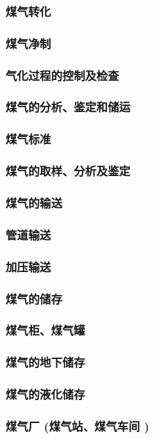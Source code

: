 \documentclass[UTF8]{../../ApplicationUniverse}
\begin{document}
    \subsubsection{煤气转化}
    \subsubsection{煤气净制}
    \subsubsection{气化过程的控制及检查}
\subsubsection{煤气的分析、鉴定和储运}
    \subsubsection{煤气标准}
    \subsubsection{煤气的取样、分析及鉴定}
    \subsubsection{煤气的输送}
        \subsubsection{管道输送}
        \subsubsection{加压输送}
    \subsubsection{煤气的储存}
        \subsubsection{煤气柜、煤气罐}
        \subsubsection{煤气的地下储存}
        \subsubsection{煤气的液化储存}
\subsubsection{煤气厂 (煤气站、煤气车间 )}
\end{document}
